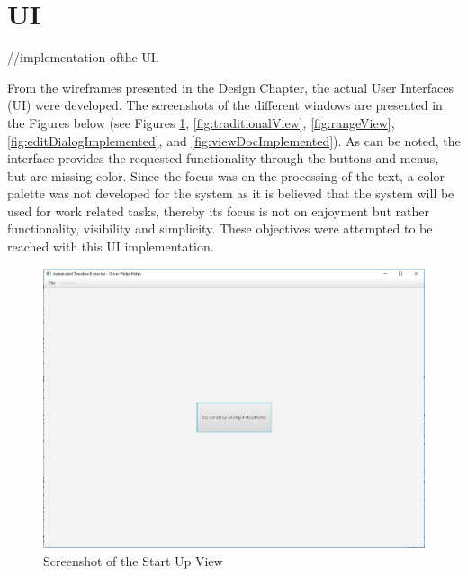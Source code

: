 \section{UI}
//implementation ofthe UI.
\par From the wireframes presented in the Design Chapter, the actual User Interfaces (UI) were developed. The screenshots of the different windows are presented in the Figures below (see Figures \ref{fig:startUpImplemented}, \ref{fig:traditionalView}, \ref{fig:rangeView}, \ref{fig:editDialogImplemented}, and \ref{fig:viewDocImplemented}). As can be noted, the interface provides the requested functionality through the buttons and menus, but are missing color. Since the focus was on the processing of the text, a color palette was not developed for the system as it is believed that the system will be used for work related tasks, thereby its focus is not on enjoyment but rather functionality, visibility and simplicity. These objectives were attempted to be reached with this UI implementation.
\begin{figure}[h]
\caption{Screenshot of the Start Up View}
\label{fig:startUpImplemented}
\includegraphics[width=\linewidth]{startUpImplemented.png}
\centering
\end{figure}
